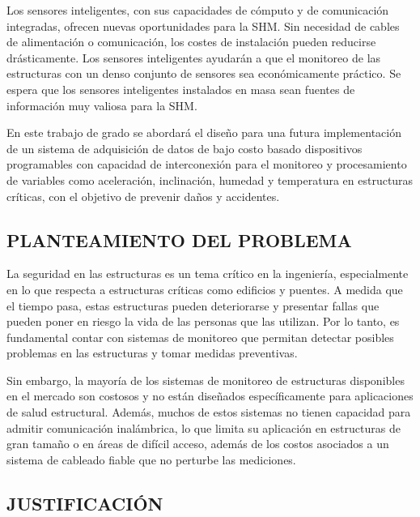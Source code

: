 \documentclass[12pt,letterpaper]{article}
\begin{document}
Los sensores inteligentes, con sus capacidades de cómputo y de comunicación integradas, ofrecen nuevas oportunidades para la SHM. Sin necesidad de cables de alimentación o comunicación, los costes de instalación pueden reducirse drásticamente. Los sensores inteligentes ayudarán a que el monitoreo de las estructuras con un denso conjunto de sensores sea económicamente práctico. Se espera que los sensores inteligentes instalados en masa sean fuentes de información muy valiosa para la SHM.

En este trabajo de grado se abordará el diseño para una futura implementación de un sistema de adquisición de datos de bajo costo basado dispositivos programables con capacidad de interconexión para el monitoreo y procesamiento de variables como aceleración, inclinación, humedad y temperatura en estructuras críticas, con el objetivo de prevenir daños y accidentes.

\newpage



\begin{center}
	\section*{ PLANTEAMIENTO DEL PROBLEMA}
\end{center}


\vspace{0.3cm}

La seguridad en las estructuras es un tema crítico en la ingeniería, especialmente en lo que respecta a estructuras críticas como edificios y puentes. A medida que el tiempo pasa, estas estructuras pueden deteriorarse y presentar fallas que pueden poner en riesgo la vida de las personas que las utilizan. Por lo tanto, es fundamental contar con sistemas de monitoreo que permitan detectar posibles problemas en las estructuras y tomar medidas preventivas.

Sin embargo, la mayoría de los sistemas de monitoreo de estructuras disponibles en el mercado son costosos y no están diseñados específicamente para aplicaciones de salud estructural. Además, muchos de estos sistemas no tienen capacidad para admitir comunicación inalámbrica, lo que limita su aplicación en estructuras de gran tamaño o en áreas de difícil acceso, además de los costos asociados a un sistema de cableado fiable que no perturbe las mediciones.



\newpage


\begin{center}
	\section*{JUSTIFICACIÓN}
\end{center}
\end{document}
